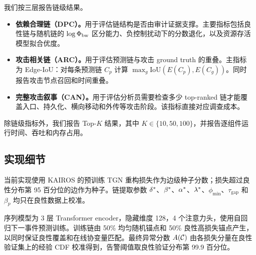 我们按三层报告链级结果。
\begin{itemize}
\item \textbf{依赖合理链（DPC）。}用于评估链结构是否由审计证据支撑。主要指标包括良性链与随机链的 $\log\Phi_{\text{bw}}$ 区分能力、负控制扰动下的分数退化，以及资源存活模型拟合优度。
\item \textbf{攻击相关链（ARC）。}用于评估预测链与攻击 ground truth 的重叠。主指标为 Edge-IoU：对每条预测链 $C_p$ 计算 $\max_g \mathrm{IoU}(E(C_p),E(C_g))$。同时报告攻击节点召回和时间重叠。
\item \textbf{完整攻击叙事（CAN）。}用于评估分析员需要检查多少 top-ranked 链才能覆盖入口、持久化、横向移动和外传等攻击阶段。该指标直接对应调查成本。
\end{itemize}

除链级指标外，我们报告 Top-$K$ 结果，其中 $K\in\{10,50,100\}$，并报告逐组件运行时间、吞吐和内存占用。

\subsection{实现细节}

当前实现使用 KAIROS 的预训练 TGN 重构损失作为边级种子分数；损失超过良性分布第 95 百分位的边作为种子。链提取参数 $\delta^*$、$\beta^*$、$\alpha^*$、$\lambda^*$、$\phi_{\min}$、$\tau_{\text{gap}}$ 和 $\beta_p$ 均只在良性数据上校准。

序列模型为 3 层 Transformer encoder，隐藏维度 128，4 个注意力头，使用自回归下一事件预测训练。训练链由 50\% 均匀随机锚点和 50\% 良性高损失锚点产生，以同时保证良性覆盖和在线协变量匹配。最终异常分数 $A(\mathcal{C})$ 由各损失分量在良性验证集上的经验 CDF 校准得到，告警阈值取良性验证分布第 99.9 百分位。
